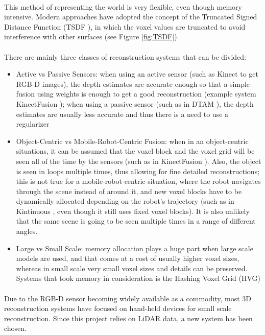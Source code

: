 \documentclass[12pt]{article}
\begin{document}
	
	\paragraph{} This method of representing the world is very flexible, even though memory intensive. Modern approaches have adopted the concept of the Truncated Signed Distance Function (TSDF \cite{TSDF}), in which the voxel values are truncated to avoid interference with other surfaces (see Figure \ref{fig:TSDF}).
	
	\paragraph{}
	There are mainly three classes of reconstruction systems that can be divided:
	\begin{itemize}
		\item Active vs Passive Sensors: when using an active sensor (such as Kinect to get RGB-D images), the depth estimates are accurate enough so that a simple fusion using weights is enough to get a good reconstruction (example system KinectFusion \cite{kinectfusion}); when using a passive sensor (such as in DTAM \cite{DTAM}), the depth estimates are usually less accurate and thus there is a need to use a regularizer
		\item Object-Centric vs Mobile-Robot-Centric Fusion: when in an object-centric situations, it can be assumed that the voxel block and the voxel grid will be seen all of the time by the sensors (such as in KinectFusion \cite{kinectfusion}). Also, the object is seen in loops multiple times, thus allowing for fine detailed reconstructions; this is not true for a mobile-robot-centric situation, where the robot navigates through the scene instead of around it, and new voxel blocks have to be dynamically allocated depending on the robot's trajectory (such as in Kintinuous \cite{kintinuous}, even though it still uses fixed voxel blocks). It is also unlikely that the same scene is going to be seen multiple times in a range of different angles.
		\item Large vs Small Scale: memory allocation plays a huge part when large scale models are used, and that comes at a cost of usually higher voxel sizes, whereas in small scale very small voxel sizes and details can be preserved. Systems that took memory in consideration is the Hashing Voxel Grid (HVG) \cite{HVG}
	\end{itemize}
	
	\paragraph{}
	Due to the RGB-D sensor becoming widely available as a commodity, most 3D reconstruction systems have focused on hand-held devices for small scale reconstruction. Since this project relies on LiDAR data, a new system has been chosen.	
	
\end{document}
